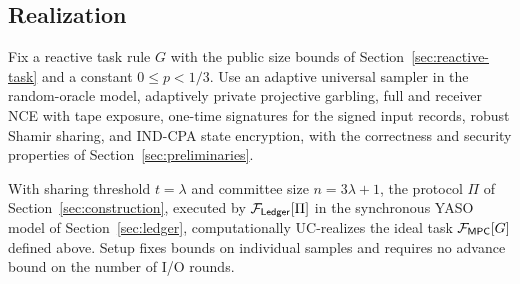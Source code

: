 \subsection{Realization}
\begin{theorem}
\label{thm:yaso-mpc}
Fix a reactive task rule $G$ with the public size bounds of
Section~\ref{sec:reactive-task} and a constant $0\le p<1/3$.
Use an adaptive universal sampler in the random-oracle model, adaptively
private projective garbling, full and receiver NCE with tape exposure,
one-time signatures for the signed input records, robust Shamir sharing,
and IND-CPA state encryption, with the correctness and security properties
of Section~\ref{sec:preliminaries}.

With sharing threshold $t=\lambda$ and committee size $n=3\lambda+1$,
the protocol $\Pi$ of
Section~\ref{sec:construction}, executed by $\mathcal F_{\mathsf{Ledger}}[\Pi]$ in the
synchronous YASO model of Section~\ref{sec:ledger}, computationally
UC-realizes the ideal task $\mathcal F_{\mathsf{MPC}}[G]$ defined above.
Setup fixes bounds on individual samples and requires no advance bound
on the number of I/O rounds.
\end{theorem}
